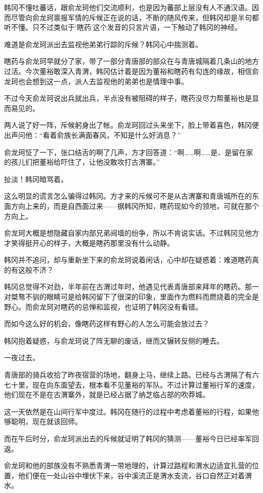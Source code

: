 韩冈不懂吐蕃话，跟俞龙珂他们交流顺利，也是因为蕃部上层没有人不通汉语。因而尽管向俞龙珂禀报军情的斥候正在说的话，不断的随风传来，但韩冈却是半句都听不懂。只不过类似于‘瞎药’这个发音的只言片语，一下触动了韩冈的神经。

难道是俞龙珂派出去监视他弟弟行踪的斥候？韩冈心中揣测着。

瞎药与俞龙珂早就分了家，带了一部分青唐部的部众在与青唐城隔着几条山的地方过活。今次董裕敢深入青渭，韩冈估计着是因为董裕和瞎药有勾连的缘故，相信俞龙珂也会想到这一点，派人去监视他的弟弟也是情理中事。

不过今天俞龙珂说出兵就出兵，半点没有被阻碍的样子，瞎药没尽力帮董裕也是显而易见的。

两人说了好一阵，斥候躬身出了帐。俞龙珂回过头来坐下，脸上带着喜色，韩冈便出声问他：“看着俞族长满面春风，不知是什么好消息？”

俞龙珂怔了一下，张口结舌的啊了几声，方才回答道：“啊……啊……是、是留在家的孩儿们把董裕给吓住了，让他没敢攻打古渭寨。”

扯淡！韩冈暗骂着。

这么明显的谎言怎么骗得过韩冈。方才来的斥候可不是从古渭寨和青唐城所在的东面方向上来的，而是自西面过来——据韩冈所知，瞎药现如今的领地，可就在那个方向上。

俞龙珂大概是想隐藏自家内部兄弟阋墙的纷争，所以不肯说实话。不过韩冈见他方才笑得挺开心的样子，大概是瞎药那里没有什么动静。

韩冈并不追问，却与重新坐下来的俞龙珂说着闲话，心中却在疑惑着：难道瞎药真的有这般不济？

韩冈总觉得不对劲，半年前在古渭过年时，他遇见代表青唐部来拜年的瞎药。那一对桀骜不驯的眼睛可是给韩冈留下了很深的印象，里面作为燃料而燃烧着的完全是野心。而俞龙珂对瞎药的忌惮和监视，也证明了韩冈没有看错。

而如今这么好的机会，像瞎药这样有野心的人怎么可能会放过去？

韩冈抱着疑惑，与俞龙珂说了阵无聊的废话，继而又辗转反侧的睡去。

一夜过去。

青唐部的骑兵收拾了昨夜宿营的场地，翻身上马，继续上路。已经与古渭隔了有六七十里，现在向东面望去，根本看不见董裕的军队。不过计算过董裕行军的速度，他们现在不是在古渭寨外，就是已经占据了纳芝临占部的吹莽城。

这一天依然是在山间行军中度过。韩冈在随行的过程中考虑着董裕的行程，如果他够聪明，现在就该回师。

而在午后时分，俞龙珂派出去的斥候就证明了韩冈的猜测——董裕今日已经率军回返。

俞龙珂和他的部族没有不熟悉青渭一带地理的，计算过路程和渭水边适宜扎营的位置，他们便在一处山谷中埋伏下来，谷中溪流正是渭水支流，谷口自然正对着渭水。

